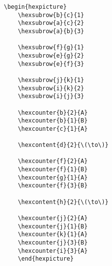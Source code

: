 \documentclass[a4paper,12pt]{article}
\begin{document}
    \begin{hexpicture}
    \end{hexpicture}
    
    \begin{verbatim}\begin{hexpicture}
    \hexsubrow{b}{c}{1}
    \hexsubrow{a}{c}{2}
    \hexsubrow{a}{b}{3}
    
    \hexsubrow{f}{g}{1}
    \hexsubrow{e}{g}{2}
    \hexsubrow{e}{f}{3}
    
    \hexsubrow{j}{k}{1}
    \hexsubrow{i}{k}{2}
    \hexsubrow{i}{j}{3}
    
    \hexcounter{b}{2}{A}
    \hexcounter{b}{1}{B}
    \hexcounter{c}{1}{A}
    
    \hexcontent{d}{2}{\(\to\)}
    
    \hexcounter{f}{2}{A}
    \hexcounter{f}{1}{B}
    \hexcounter{g}{1}{A}
    \hexcounter{f}{3}{B}
    
    \hexcontent{h}{2}{\(\to\)}
    
    \hexcounter{j}{2}{A}
    \hexcounter{j}{1}{B}
    \hexcounter{k}{1}{A}
    \hexcounter{j}{3}{B}
    \hexcounter{i}{3}{A}
    \end{hexpicture}\end{verbatim}
    
    \begin{hexpicture}
        
        
        
        
        
        
        
    \end{hexpicture}
    
\end{document}
